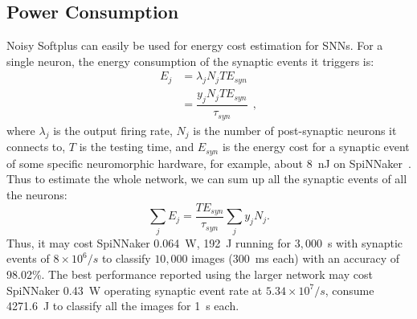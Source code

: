 \documentclass{article}
\begin{document}
\subsection{Power Consumption}
Noisy Softplus can easily be used for energy cost estimation for SNNs.
For a single neuron, the energy consumption of the synaptic events it triggers is:
\begin{equation}
\begin{aligned}
E_{j} &= \lambda_j N_j T E_{syn}\\
&= \dfrac{y_j N_j T E_{syn}}{\tau_{syn}}~~,
\end{aligned}
\label{equ:energy}
\end{equation}
where $\lambda_j$ is the output firing rate, $N_j$ is the number of post-synaptic neurons it connects to, $T$ is the testing time, and $E_{syn}$ is the energy cost for a synaptic event of some specific neuromorphic hardware, for example, about 8~nJ on SpiNNaker~\cite{stromatias2013power}.
Thus to estimate the whole network, we can sum up all the synaptic events of all the neurons:
\begin{equation}
\sum_j E_{j} =  \dfrac{T E_{syn}}{\tau_{syn}} \sum_{j}y_j N_j.
\end{equation}
Thus, it may cost SpiNNaker 0.064~W, 192~J running for $3,000$~s with synaptic events of $8\times10^6/s$ to classify $10,000$ images (300~ms each) with an accuracy of 98.02\%.
The best performance reported using the larger network may cost SpiNNaker 0.43~W operating synaptic event rate at $5.34\times10^7/s$, consume 4271.6~J to classify all the images for 1~s each.
\end{document}
